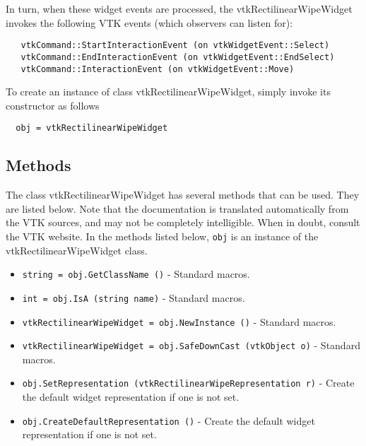  In turn, when these widget events are processed, the
 vtkRectilinearWipeWidget invokes the following VTK events (which
 observers can listen for):
 \begin{verbatim}
   vtkCommand::StartInteractionEvent (on vtkWidgetEvent::Select)
   vtkCommand::EndInteractionEvent (on vtkWidgetEvent::EndSelect)
   vtkCommand::InteractionEvent (on vtkWidgetEvent::Move)
 \end{verbatim}


To create an instance of class vtkRectilinearWipeWidget, simply
invoke its constructor as follows
\begin{verbatim}
  obj = vtkRectilinearWipeWidget
\end{verbatim}
\subsection{Methods}

The class vtkRectilinearWipeWidget has several methods that can be used.
  They are listed below.
Note that the documentation is translated automatically from the VTK sources,
and may not be completely intelligible.  When in doubt, consult the VTK website.
In the methods listed below, \verb|obj| is an instance of the vtkRectilinearWipeWidget class.
\begin{itemize}
\item  \verb|string = obj.GetClassName ()| -  Standard macros.

\item  \verb|int = obj.IsA (string name)| -  Standard macros.

\item  \verb|vtkRectilinearWipeWidget = obj.NewInstance ()| -  Standard macros.

\item  \verb|vtkRectilinearWipeWidget = obj.SafeDownCast (vtkObject o)| -  Standard macros.

\item  \verb|obj.SetRepresentation (vtkRectilinearWipeRepresentation r)| -  Create the default widget representation if one is not set. 

\item  \verb|obj.CreateDefaultRepresentation ()| -  Create the default widget representation if one is not set. 

\end{itemize}

